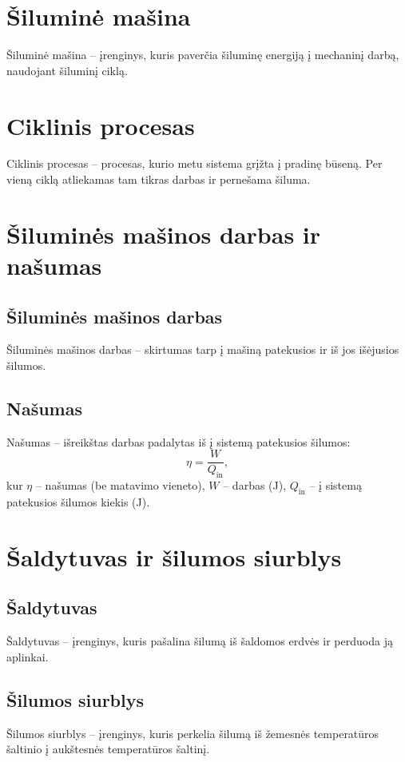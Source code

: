 \documentclass[a4paper,12pt]{article}
\begin{document}
\section{Šiluminė mašina}
Šiluminė mašina – įrenginys, kuris paverčia šiluminę energiją į mechaninį darbą, naudojant šiluminį ciklą.

\section{Ciklinis procesas}
Ciklinis procesas – procesas, kurio metu sistema grįžta į pradinę būseną. Per vieną ciklą atliekamas tam tikras darbas ir pernešama šiluma.

\section{Šiluminės mašinos darbas ir našumas}

\subsection{Šiluminės mašinos darbas}
Šiluminės mašinos darbas – skirtumas tarp į mašiną patekusios ir iš jos išėjusios šilumos.

\subsection{Našumas}
Našumas – išreikštas darbas padalytas iš į sistemą patekusios šilumos:
\[
\eta = \frac{W}{Q_{\text{in}}},
\]
kur $\eta$ – našumas (be matavimo vieneto), $W$ – darbas (J), $Q_{\text{in}}$ – į sistemą patekusios šilumos kiekis (J).

\section{Šaldytuvas ir šilumos siurblys}

\subsection{Šaldytuvas}
Šaldytuvas – įrenginys, kuris pašalina šilumą iš šaldomos erdvės ir perduoda ją aplinkai.

\subsection{Šilumos siurblys}
Šilumos siurblys – įrenginys, kuris perkelia šilumą iš žemesnės temperatūros šaltinio į aukštesnės temperatūros šaltinį.
\end{document}
